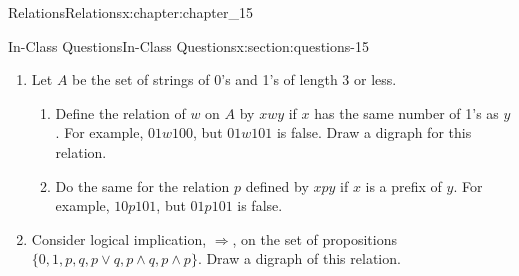 \documentclass[oneside,10pt,]{book}
\numberwithin{equation}{section}
\begin{document}
\begin{chapterptx}{Relations}{}{Relations}{}{}{x:chapter:chapter_15}
\begin{sectionptx}{In-Class Questions}{}{In-Class Questions}{}{}{x:section:questions-15}
\begin{enumerate}[label=\arabic*.]
\item{}Let \(A\) be the set of strings of 0's and 1's of length 3 or less.%
\begin{enumerate}[label=(\alph*)]
\item{}Define the relation of \(w\) on \(A\) by \(x w y\) if \(x\) has the same number of 1's as \(y\). For example, \(01 w 100\), but \(01 w 101\) is false. Draw a digraph for this relation.%
\item{}Do the same for the relation \(p\) defined by \(x p y\) if \(x\) is a prefix of \(y\). For example, \(10 p 101\), but \(01 p 101\) is false.%
\end{enumerate}
%
\item{}Consider logical implication, \(\Rightarrow\), on the set of propositions \(\{0,1,p,q,p\lor q, p\land q, p\land p \}\). Draw a digraph of this relation.%
\end{enumerate}
%
\end{sectionptx}
\end{chapterptx}
%
%
\typeout{************************************************}
\typeout{************************************************}
%
\end{document}
